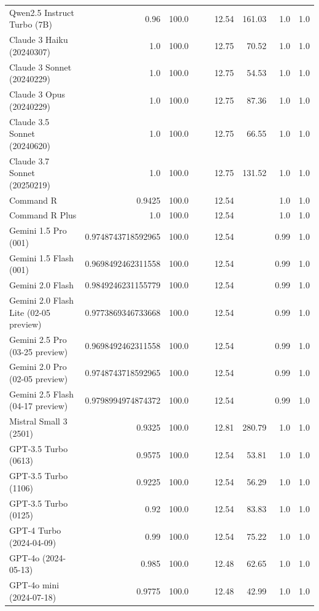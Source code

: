\begin{table}[htp]
{\begin{tabular}{lrrrrrrrr}
Qwen2.5 Instruct Turbo (7B) & 0.96 & 100.0 &  &  & 12.54 & 161.03 & 1.0 & 1.0 \\
Claude 3 Haiku (20240307) & 1.0 & 100.0 &  &  & 12.75 & 70.52 & 1.0 & 1.0 \\
Claude 3 Sonnet (20240229) & 1.0 & 100.0 &  &  & 12.75 & 54.53 & 1.0 & 1.0 \\
Claude 3 Opus (20240229) & 1.0 & 100.0 &  &  & 12.75 & 87.36 & 1.0 & 1.0 \\
Claude 3.5 Sonnet (20240620) & 1.0 & 100.0 &  &  & 12.75 & 66.55 & 1.0 & 1.0 \\
Claude 3.7 Sonnet (20250219) & 1.0 & 100.0 &  &  & 12.75 & 131.52 & 1.0 & 1.0 \\
Command R & 0.9425 & 100.0 &  &  & 12.54 &  & 1.0 & 1.0 \\
Command R Plus & 1.0 & 100.0 &  &  & 12.54 &  & 1.0 & 1.0 \\
Gemini 1.5 Pro (001) & 0.9748743718592965 & 100.0 &  &  & 12.54 &  & 0.99 & 1.0 \\
Gemini 1.5 Flash (001) & 0.9698492462311558 & 100.0 &  &  & 12.54 &  & 0.99 & 1.0 \\
Gemini 2.0 Flash & 0.9849246231155779 & 100.0 &  &  & 12.54 &  & 0.99 & 1.0 \\
Gemini 2.0 Flash Lite (02-05 preview) & 0.9773869346733668 & 100.0 &  &  & 12.54 &  & 0.99 & 1.0 \\
Gemini 2.5 Pro (03-25 preview) & 0.9698492462311558 & 100.0 &  &  & 12.54 &  & 0.99 & 1.0 \\
Gemini 2.0 Pro (02-05 preview) & 0.9748743718592965 & 100.0 &  &  & 12.54 &  & 0.99 & 1.0 \\
Gemini 2.5 Flash (04-17 preview) & 0.9798994974874372 & 100.0 &  &  & 12.54 &  & 0.99 & 1.0 \\
Mistral Small 3 (2501) & 0.9325 & 100.0 &  &  & 12.81 & 280.79 & 1.0 & 1.0 \\
GPT-3.5 Turbo (0613) & 0.9575 & 100.0 &  &  & 12.54 & 53.81 & 1.0 & 1.0 \\
GPT-3.5 Turbo (1106) & 0.9225 & 100.0 &  &  & 12.54 & 56.29 & 1.0 & 1.0 \\
GPT-3.5 Turbo (0125) & 0.92 & 100.0 &  &  & 12.54 & 83.83 & 1.0 & 1.0 \\
GPT-4 Turbo (2024-04-09) & 0.99 & 100.0 &  &  & 12.54 & 75.22 & 1.0 & 1.0 \\
GPT-4o (2024-05-13) & 0.985 & 100.0 &  &  & 12.48 & 62.65 & 1.0 & 1.0 \\
GPT-4o mini (2024-07-18) & 0.9775 & 100.0 &  &  & 12.48 & 42.99 & 1.0 & 1.0 \\

\end{tabular}}
\end{table}

